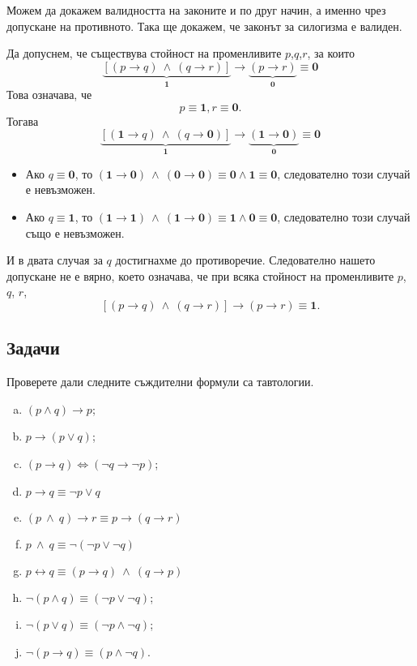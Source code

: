 \begin{example}
  Можем да докажем валидността на законите и по друг начин, а именно чрез допускане на противното.
  Така ще докажем, че законът за силогизма е валиден.
  
  Да допуснем, че съществува стойност на променливите $p$,$q$,$r$, за които
  \[\underbrace{[(p\rightarrow q)\ \wedge\ (q\rightarrow r)]}_{\mathbf{1}} \rightarrow \underbrace{(p\rightarrow r)}_{\mathbf{0}} \equiv {\mathbf 0}\]
  Това означава, че
  \[p \equiv \mathbf{1}, r \equiv \mathbf{0}.\]
  Тогава
  \[\underbrace{[(\mathbf{1}\rightarrow q)\ \wedge\ (q\rightarrow \mathbf{0})]}_{\mathbf{1}} \rightarrow \underbrace{(\mathbf{1}\rightarrow \mathbf{0})}_{\mathbf{0}} \equiv {\mathbf 0}\]
  \begin{itemize}
  \item 
    Ако $q \equiv \mathbf{0}$, то $(\mathbf{1}\rightarrow \mathbf{0})\ \wedge\ (\mathbf{0}\rightarrow \mathbf{0}) \equiv \mathbf{0} \wedge \mathbf{1} \equiv \mathbf{0}$,
    следователно този случай е невъзможен.
  \item
    Ако $q \equiv \mathbf{1}$, то $(\mathbf{1}\rightarrow \mathbf{1})\ \wedge\ (\mathbf{1}\rightarrow \mathbf{0}) \equiv \mathbf{1} \wedge \mathbf{0} \equiv \mathbf{0}$,
    следователно този случай също е невъзможен.
  \end{itemize}
  И в двата случая за $q$ достигнахме до противоречие.
  Следователно нашето допускане не е вярно, което означава, че
  при всяка стойност на променливите $p$, $q$, $r$,
  \[[(p\rightarrow q)\ \wedge\ (q\rightarrow r)] \rightarrow (p\rightarrow r) \equiv {\mathbf 1}.\]
\end{example}

\subsection{Задачи}

\begin{problem}
  Проверете дали следните съждителни формули са тавтологии.
  \begin{enumerate}[a)]
  \item
    $(p\wedge q)\rightarrow p$;
  \item
    $p\rightarrow(p\vee q)$;
  \item
    $(p\rightarrow q) \iff (\neg q \rightarrow \neg p)$;
  \item
    $p\rightarrow q \equiv \neg p \vee q$
  \item
    $(p\ \wedge\ q) \rightarrow r \equiv p \rightarrow (q\rightarrow r)$
  \item
    $p\ \wedge\ q \equiv \neg(\neg p \vee \neg q)$
  \item
    $p \leftrightarrow q \equiv (p\rightarrow q)\ \wedge\ (q\rightarrow p)$
  \item
    $\neg(p\wedge q) \equiv (\neg p \vee \neg q)$;
  \item
    $\neg(p\vee q) \equiv (\neg p \wedge \neg q)$;
  \item
    $\neg(p\rightarrow q) \equiv (p\wedge \neg q)$.
  \end{enumerate}
\end{problem}

